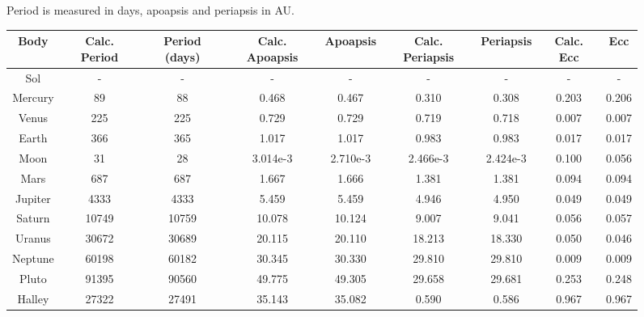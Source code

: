 \documentclass[a4paper, 11pt, british, left=1in, right=1in, top=0.3in, bottom=1in]{article}
\begin{document}
	\begin{figure}[H]
		
	{\footnotesize
		Period is measured in days, apoapsis and periapsis in AU. \\
		
	\centering
	\begin{tabular}{|c|c|c|c|c|c|c|c|c|}
		\hline Body & Calc. Period& Period (days) & Calc. Apoapsis& Apoapsis& Calc. Periapsis & Periapsis & Calc. Ecc & Ecc\\ 
		\hline Sol & - & - & - & - & - & - &- &-\\ 
		\hline Mercury & 89 & 88 & 0.468 & 0.467 & 0.310 & 0.308 & 0.203 & 0.206\\ 
		\hline Venus & 225 & 225 & 0.729 & 0.729 & 0.719 & 0.718 & 0.007& 0.007\\ 
		\hline Earth & 366 & 365 & 1.017 & 1.017 & 0.983 & 0.983 & 0.017 & 0.017 \\ 
		\hline Moon & 31 & 28 & 3.014e-3 & 2.710e-3 & 2.466e-3 & 2.424e-3 & 0.100 & 0.056\\ 
		\hline Mars & 687 & 687 & 1.667 & 1.666 & 1.381 & 1.381 & 0.094& 0.094\\ 
		\hline Jupiter & 4333 & 4333 & 5.459 & 5.459 & 4.946 & 4.950 & 0.049 & 0.049\\ 
		\hline Saturn & 10749 & 10759 & 10.078 & 10.124 & 9.007 & 9.041& 0.056 & 0.057\\
		\hline Uranus & 30672 & 30689 & 20.115 & 20.110 & 18.213 & 18.330 & 0.050 & 0.046\\
		\hline Neptune & 60198 & 60182 & 30.345 & 30.330 & 29.810 & 29.810 & 0.009 & 0.009\\
		\hline Pluto & 91395 & 90560 & 49.775 & 49.305 & 29.658 & 29.681 & 0.253 & 0.248 \\
		\hline Halley & 27322 & 27491 & 35.143 & 35.082 & 0.590 & 0.586& 0.967 & 0.967\\
		\hline 
	\end{tabular} 
	\label{tab:obsv}
}
\end{figure}
\end{document}
